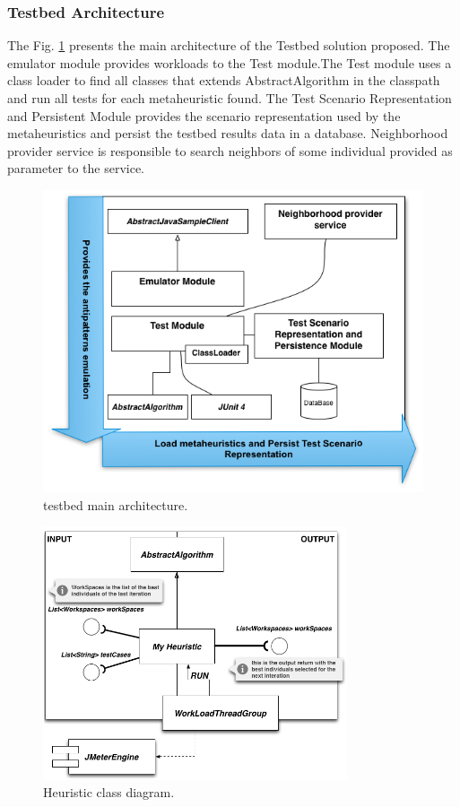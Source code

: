 \subsubsection{Testbed Architecture}


The Fig. \ref{fig:testbedarch} presents the main architecture of the Testbed solution proposed. The emulator module provides workloads to the Test module.The Test module uses a class loader to find all classes that extends AbstractAlgorithm in the classpath and run all tests for each metaheuristic found. The Test Scenario Representation and Persistent Module provides the scenario representation used by the metaheuristics and persist the testbed results data in a database. Neighborhood provider service is responsible to search neighbors of some individual provided as parameter to the service.

\begin{figure}[h]
\centering
\includegraphics[width=1\textwidth]{./images/testbedarch.png}
\caption{testbed main architecture.}
\label{fig:testbedarch}
\end{figure} 

\begin{figure}[h]
\centering
\includegraphics[width=0.8\textwidth]{./images/myheuristic.png}
\caption{Heuristic class diagram.}
\label{fig:heuristicclassdiagram}
\end{figure} 



